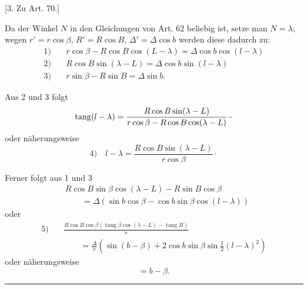 \begin{center}
[3. Zu Art. 70.]
\end{center}
Da der Winkel \(N\) in den Gleichungen von Art. 62 beliebig ist, setze man \(N=\lambda\); wegen \(r'=r\cos\beta\), \(R'=R\cos B\), \(\Delta'=\Delta\cos b\) werden diese dadurch zu:
\[
\begin{aligned}
1)\quad&r\cos\beta-R\cos B\cos(L-\lambda)=\Delta\cos b\cos(l-\lambda)\\
2)\quad&R\cos B\sin(\lambda-L)=\Delta\cos b\sin(l-\lambda)\\
3)\quad&r\sin\beta-R\sin B=\Delta\sin b.
\end{aligned}
\]

Aus 2 und 3 folgt
\[
\operatorname{tang}(l-\lambda)=\frac{R\cos B\sin(\lambda-L)}{r\cos\beta-R\cos B\cos(\lambda-L)}\,\mathpunct{\vcenter{\hbox{\rule{.45em}{.35pt}}}}
\]
oder näherungsweise
\[
4)\quad l-\lambda=\frac{R\cos B\sin(\lambda-L)}{r\cos\beta}\mathpunct{\cdot}
\]

Ferner folgt aus 1 und 3
\[
\begin{aligned}
&R\cos B\sin\beta\cos(\lambda-L)-R\sin B\cos\beta\\
&\qquad=\Delta(\sin b\cos\beta-\cos b\sin\beta\cos(l-\lambda))
\end{aligned}
\]
oder
\[
\begin{aligned}
5)\quad&\frac{R\cos B\cos\beta(\operatorname{tang}\beta\cos(\lambda-L)-\operatorname{tang}B)}{r}\\
&\qquad=\frac{\Delta}{r}(\sin(b-\beta)+2\cos b\sin\beta\sin\tfrac12(l-\lambda)^2)
\end{aligned}
\]
oder näherungsweise
\[
=b-\beta.
\]
\begin{center}\rule{.18\textwidth}{.35pt}\end{center}
